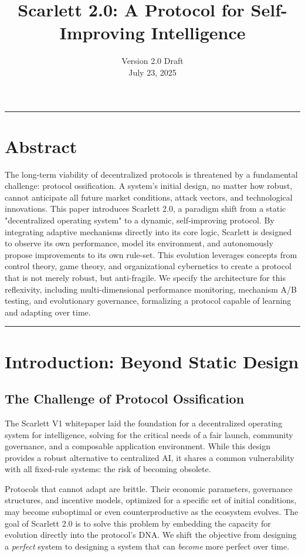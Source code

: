 \documentclass[10pt]{article}
\title{\textbf{Scarlett 2.0: A Protocol for Self-Improving Intelligence}}
\author{Version 2.0 Draft \\ July 23, 2025}
\date{}
\begin{document}
\maketitle
\thispagestyle{fancy}

\tableofcontents
\newpage

\hrule
\vspace{1em}
\section*{Abstract}
The long-term viability of decentralized protocols is threatened by a fundamental challenge: protocol ossification. A system's initial design, no matter how robust, cannot anticipate all future market conditions, attack vectors, and technological innovations. This paper introduces Scarlett 2.0, a paradigm shift from a static "decentralized operating system" to a dynamic, self-improving protocol. By integrating adaptive mechanisms directly into its core logic, Scarlett is designed to observe its own performance, model its environment, and autonomously propose improvements to its own rule-set. This evolution leverages concepts from control theory, game theory, and organizational cybernetics to create a protocol that is not merely robust, but anti-fragile. We specify the architecture for this reflexivity, including multi-dimensional performance monitoring, mechanism A/B testing, and evolutionary governance, formalizing a protocol capable of learning and adapting over time.
\vspace{1em}
\hrule

\newpage

\section{Introduction: Beyond Static Design}

\subsection{The Challenge of Protocol Ossification}
The Scarlett V1 whitepaper laid the foundation for a decentralized operating system for intelligence, solving for the critical needs of a fair launch, community governance, and a composable application environment. While this design provides a robust alternative to centralized AI, it shares a common vulnerability with all fixed-rule systems: the risk of becoming obsolete.

Protocols that cannot adapt are brittle. Their economic parameters, governance structures, and incentive models, optimized for a specific set of initial conditions, may become suboptimal or even counterproductive as the ecosystem evolves. The goal of Scarlett 2.0 is to solve this problem by embedding the capacity for evolution directly into the protocol's DNA. We shift the objective from designing a \textit{perfect} system to designing a system that can \textit{become} more perfect over time.
\end{document}

